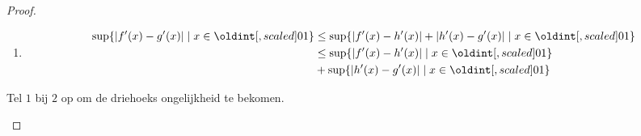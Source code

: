 \documentclass[main.tex]{subfiles}
\begin{document}
\begin{vb}
\begin{proof}
\begin{itemize}
\begin{enumerate}
      \item 
        \begin{align*}
          \sup\{|f'(x)-g'(x)| \mid x\in\interval{0}{1}\}
          &\le \sup\{|f'(x) - h'(x)| + |h'(x) - g'(x)| \mid x\in\interval{0}{1}\}\\ 
          &\le \sup\{|f'(x)-h'(x)| \mid x\in\interval{0}{1}\} \\
          &+ \sup\{|h'(x)-g'(x)| \mid x\in\interval{0}{1}\}\\
        \end{align*}
      \end{enumerate}
      Tel $1$ bij $2$ op om de driehoeks ongelijkheid te bekomen.
    \end{itemize}
  \end{proof}
\end{vb}
\end{document}
